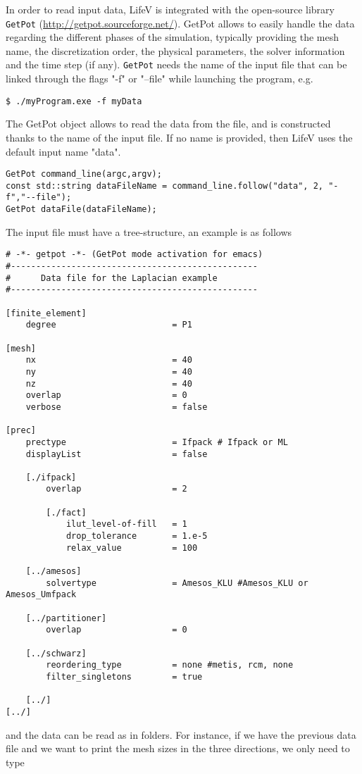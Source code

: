 In order to read input data, LifeV is integrated with the open-source library \verb!GetPot! (\url{http://getpot.sourceforge.net/}). GetPot allows to easily handle the data regarding the different phases of the simulation, typically providing the mesh name, the discretization order, the physical parameters, the solver information and the time step (if any).
\newline
\noindent \verb!GetPot! needs the name of the input file that can be linked through the flags "-f" or "--file" while launching the
program, e.g. 
\begin{lstlisting}
$ ./myProgram.exe -f myData
\end{lstlisting}
The GetPot object allows to read the data from the file, and is constructed thanks to the name of the input file. 
If no name is provided, then LifeV uses the default input name "data".
\begin{lstlisting}
GetPot command_line(argc,argv);
const std::string dataFileName = command_line.follow("data", 2, "-f","--file");
GetPot dataFile(dataFileName);
\end{lstlisting}
\noindent
The input file must have a tree-structure, an example is as follows
\begin{lstlisting}
# -*- getpot -*- (GetPot mode activation for emacs)
#-------------------------------------------------
#      Data file for the Laplacian example
#-------------------------------------------------

[finite_element]
    degree                       = P1

[mesh]
    nx                           = 40
    ny                           = 40
    nz                           = 40
    overlap                      = 0
    verbose                      = false

[prec]
    prectype                     = Ifpack # Ifpack or ML
    displayList                  = false

    [./ifpack]
        overlap                  = 2

        [./fact]
            ilut_level-of-fill   = 1
            drop_tolerance       = 1.e-5
            relax_value          = 100

    [../amesos]
        solvertype               = Amesos_KLU #Amesos_KLU or Amesos_Umfpack

    [../partitioner]
        overlap                  = 0

    [../schwarz]
        reordering_type          = none #metis, rcm, none
        filter_singletons        = true

    [../]
[../]
\end{lstlisting}
\noindent
and the data can be read as in folders. For instance, if we have the previous data file and we want to print the mesh sizes in the three directions,
we only need to type

